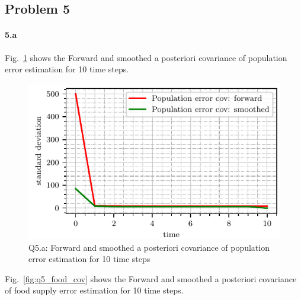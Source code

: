 \newpage
\subsection*{Problem 5}
\paragraph{5.a} Fig.~\ref{fig:q5_population_cov} shows the  Forward and smoothed a posteriori covariance of population error estimation for 10 time steps.
\begin{figure}[!h]
	\centering
	\includegraphics[scale=1.0,trim={0cm 0cm 0cm 0cm},clip]{./code/generatedPlots/q5_population_cov.pdf}
	\caption{Q5.a: Forward and smoothed a posteriori covariance of population error estimation for 10 time steps}
	\label{fig:q5_population_cov}
\end{figure}
Fig.~\ref{fig:q5_food_cov} shows the  Forward and smoothed a posteriori covariance of food supply error estimation for 10 time steps.
